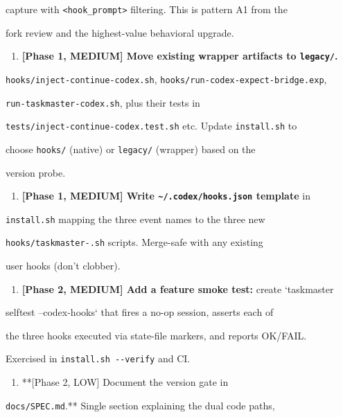 \documentclass[twocolumn,10pt,letterpaper]{article}
\begin{document}
   capture with \texttt{<hook\_prompt>} filtering. This is pattern A1 from the

   fork review and the highest-value behavioral upgrade.


\begin{enumerate}
\setlength{\itemsep}{0pt}
\setlength{\parskip}{0pt}
  \item \textbf{[Phase 1, MEDIUM] Move existing wrapper artifacts to \texttt{legacy/\allowbreak }.}
\end{enumerate}
   \texttt{hooks/\allowbreak inject-\allowbreak continue-\allowbreak codex.sh}, \texttt{hooks/\allowbreak run-\allowbreak codex-\allowbreak expect-\allowbreak bridge.exp},

   \texttt{run-\allowbreak taskmaster-\allowbreak codex.sh}, plus their tests in

   \texttt{tests/\allowbreak inject-\allowbreak continue-\allowbreak codex.test.sh} etc. Update \texttt{install.sh} to

   choose \texttt{hooks/\allowbreak } (native) or \texttt{legacy/\allowbreak } (wrapper) based on the

   version probe.


\begin{enumerate}
\setlength{\itemsep}{0pt}
\setlength{\parskip}{0pt}
  \item \textbf{[Phase 1, MEDIUM] Write \texttt{\textasciitilde{}/\allowbreak .codex/\allowbreak hooks.json} template} in
\end{enumerate}
   \texttt{install.sh} mapping the three event names to the three new

   \texttt{hooks/\allowbreak taskmaster-\allowbreak *.sh} scripts. Merge-safe with any existing

   user hooks (don't clobber).


\begin{enumerate}
\setlength{\itemsep}{0pt}
\setlength{\parskip}{0pt}
  \item \textbf{[Phase 2, MEDIUM] Add a feature smoke test:} create `taskmaster
\end{enumerate}
   selftest --codex-hooks` that fires a no-op session, asserts each of

   the three hooks executed via state-file markers, and reports OK/FAIL.

   Exercised in \texttt{install.sh -\allowbreak -\allowbreak verify} and CI.


\begin{enumerate}
\setlength{\itemsep}{0pt}
\setlength{\parskip}{0pt}
  \item **[Phase 2, LOW] Document the version gate in
\end{enumerate}
   \texttt{docs/\allowbreak SPEC.md}.** Single section explaining the dual code paths,
\end{document}
